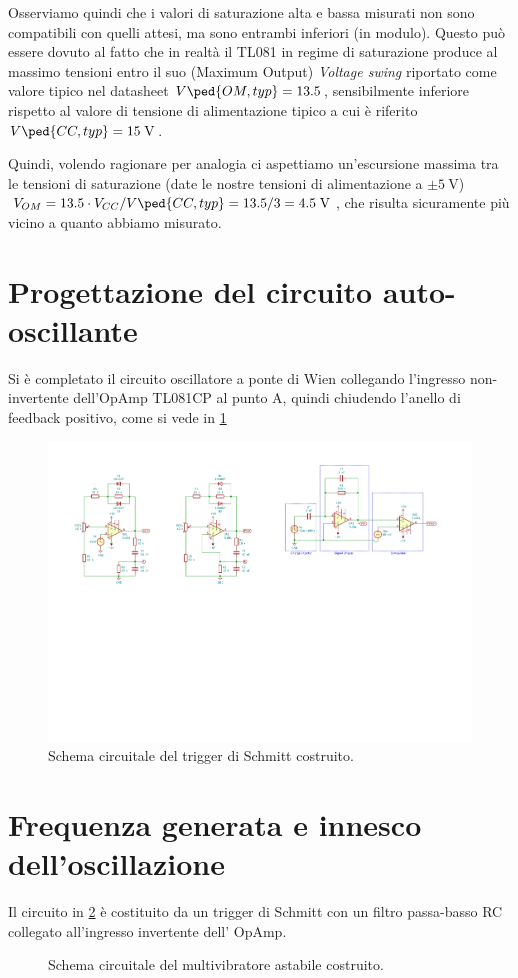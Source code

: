 \documentclass[10pt, a4paper, italian]{article}
\begin{document}
Osserviamo quindi che i valori di saturazione alta e bassa misurati non sono
compatibili con quelli attesi, ma sono entrambi inferiori (in modulo). Questo
può essere dovuto al fatto che in realtà il TL081 in regime di saturazione
produce al massimo tensioni entro il suo (Maximum Output) \emph{Voltage swing}
riportato come valore tipico nel datasheet $V\ped{OM, typ} = 13.5$,
sensibilmente inferiore rispetto al valore di tensione di alimentazione tipico
a cui è riferito $V\ped{CC, typ} = 15 \; \si{\V}$.

Quindi, volendo ragionare per analogia ci aspettiamo un'escursione massima tra
le tensioni di saturazione (date le nostre tensioni di alimentazione a
$\pm \SI{5}{\V}$) $V_{OM} = 13.5 \cdot V_{CC} / V\ped{CC, typ} =
13.5 /3 = 4.5 \; \si{\V}$, che risulta sicuramente più vicino a quanto
abbiamo misurato.

\section{Progettazione del circuito auto-oscillante}
Si è completato il circuito oscillatore a ponte di Wien collegando
l'ingresso non-invertente dell'OpAmp TL081CP al punto A, quindi chiudendo
l'anello di feedback positivo, come si vede in \cref{fig: wienschm}
\begin{figure}[htbp]
    \centering
	\includegraphics[scale=1.2]{wienschm}
    \caption{Schema circuitale del trigger di Schmitt costruito.
    \label{fig: wienschm}}
\end{figure}

\section{Frequenza generata e innesco dell'oscillazione}
Il circuito in \cref{fig: astableschm} è costituito da un trigger di
Schmitt con un filtro passa-basso RC collegato all'ingresso invertente dell'
OpAmp.
\begin{figure}[htbp]
    \centering
    \caption{Schema circuitale del multivibratore astabile costruito.
    \label{fig: astableschm}}
\end{figure}
\end{document}
